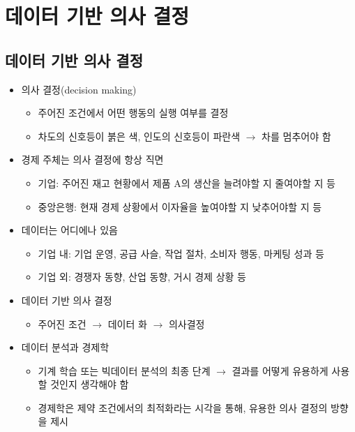\section{데이터 기반 의사 결정}\label{sec:databaseddecision}
\subsection{데이터 기반 의사 결정}
\begin{itemize}
\item 의사 결정(decision making)
	\begin{itemize}
	\item 주어진 조건에서 어떤 행동의 실행 여부를 결정
	\item 차도의 신호등이 붉은 색, 인도의 신호등이 파란색 $\rightarrow$ 차를 멈추어야 함
	\end{itemize}
\item 경제 주체는 의사 결정에 항상 직면
	\begin{itemize}
	\item 기업: 주어진 재고 현황에서 제품 A의 생산을 늘려야할 지 줄여야할 지 등
	\item 중앙은행: 현재 경제 상황에서 이자율을 높여야할 지 낮추어야할 지 등
	\end{itemize}	
\item 데이터는 어디에나 있음
	\begin{itemize}
	\item 기업 내: 기업 운영, 공급 사슬, 작업 절차, 소비자 행동, 마케팅 성과 등
	\item 기업 외: 경쟁자 동향, 산업 동향, 거시 경제 상황 등
	\end{itemize}
\item 데이터 기반 의사 결정
	\begin{itemize}
	\item 주어진 조건 $\rightarrow$ 데이터 화 $\rightarrow$ 의사결정
	\end{itemize}	
\item 데이터 분석과 경제학
	\begin{itemize}
	\item 기계 학습 또는 빅데이터 분석의 최종 단계 $\rightarrow$ 결과를 어떻게 유용하게 사용할 것인지 생각해야 함
	\item 경제학은 제약 조건에서의 최적화라는 시각을 통해, 유용한 의사 결정의 방향을 제시
	\end{itemize}
\end{itemize}

